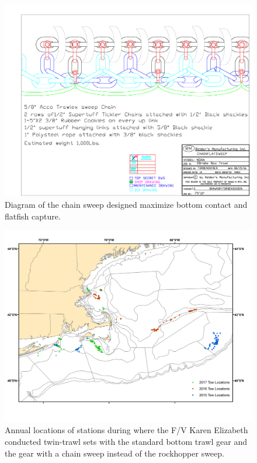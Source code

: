 \documentclass[
  12pt,
]{article}
\begin{document}
\begin{figure}
\caption{Diagram of the chain sweep designed maximize bottom contact and flatfish capture.}\label{chainsweep_schematic}
\begin{center}
\includegraphics[width = \textwidth]{chainsweep_schematic.pdf}
\end{center}
\end{figure}
\clearpage

\begin{landscape}
\begin{figure}
\caption{Annual locations of stations during where the F/V Karen Elizabeth conducted twin-trawl sets with the standard bottom trawl gear and the gear with a chain sweep instead of the rockhopper sweep.}\label{tow_locations}
\begin{center}
\includegraphics[width = \textwidth]{TwinTrawlLocationsAllYears.jpg}
\end{center}
\end{figure}
\end{landscape}
\end{document}
